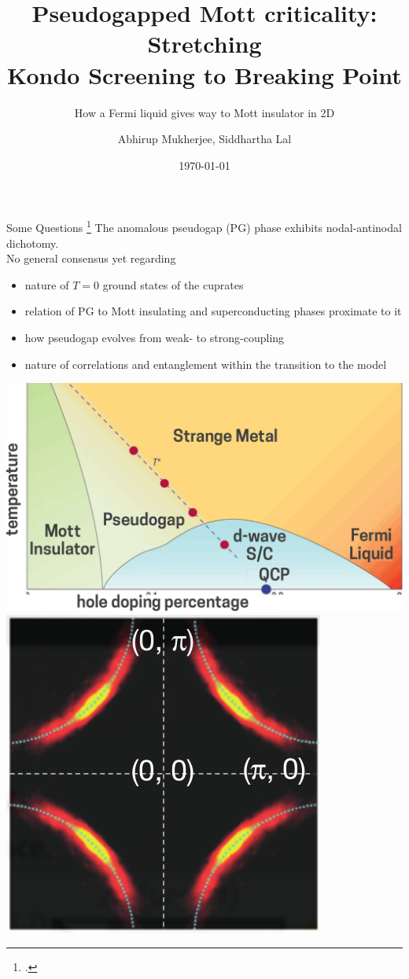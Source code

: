 \documentclass[10pt,aspectratio=169]{beamer}
\title{Pseudogapped Mott criticality: Stretching \\ Kondo Screening to Breaking Point}
\subtitle{How a Fermi liquid gives way to Mott insulator in 2D}
\author{Abhirup Mukherjee, Siddhartha Lal}
\institute
{
	Department of Physical Sciences,\\
	Indian Institute of Science Education and Research Kolkata
}
\date{\today}
\begin{document}
\begin{frame}
    \titlepage
\end{frame}

\begin{frame}{Some Questions}
\footcite{keimer2015quantum,ProustTaillefer2019,loeserKapitulnik1996,Norman1998,Hashimoto2014,KyungKotliar2006,MacridinAzevedo2006,WuFerrero2018,anirbanmott2,HilleAndergassen2020}
The anomalous \alert{pseudogap} (PG) phase exhibits nodal-antinodal dichotomy.\\[5pt]

No general consensus yet regarding
\begin{itemize}
	\item nature of \(T=0\) ground states of the cuprates
	\item \alert{relation} of PG to Mott insulating and superconducting phases proximate to it
	\item how pseudogap \alert{evolves} from weak- to strong-coupling
	\item nature of correlations and entanglement within the transition
to the model
\end{itemize}

\begin{center}
\includegraphics[height=0.2\textwidth]{cuprates.pdf}
\includegraphics[height=0.2\textwidth]{fermiArc1.png}
\end{center}

\end{frame}
\end{document}
